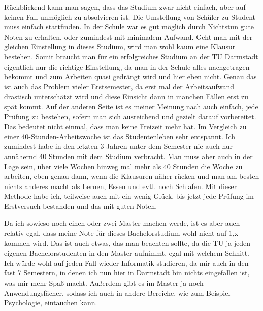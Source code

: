 {Rückblickend kann man sagen, dass das Studium zwar nicht einfach, aber auf keinen Fall unmöglich zu absolvieren ist. Die Umstellung von Schüler zu Student muss einfach stattfinden. In der Schule war es gut möglich durch Nichtstun gute Noten zu erhalten, oder zumindest mit minimalem Aufwand. Geht man mit der gleichen Einstellung in dieses Studium, wird man wohl kaum eine Klausur bestehen. Somit braucht man für ein erfolgreiches Studium an der TU Darmstadt eigentlich nur die richtige Einstellung, da man in der Schule alles nachgetragen bekommt und zum Arbeiten quasi gedrängt wird und hier eben nicht. Genau das ist auch das Problem vieler Erstsemester, da erst mal der Arbeitsaufwand drastisch unterschätzt wird und diese Einsicht dann in manchen Fällen erst zu spät kommt. Auf der anderen Seite ist es meiner Meinung nach auch einfach, jede Prüfung zu bestehen, sofern man sich ausreichend und gezielt darauf vorbereitet. Das bedeutet nicht einmal, dass man keine Freizeit mehr hat. Im Vergleich zu einer 40-Stunden-Arbeitswoche ist das Studentenleben sehr entspannt. Ich zumindest habe in den letzten 3 Jahren unter dem Semester nie auch nur annähernd 40 Stunden mit dem Studium verbracht. Man muss aber auch in der Lage sein, über viele Wochen hinweg mal mehr als 40 Stunden die Woche zu arbeiten, eben genau dann, wenn die Klausuren näher rücken und man am besten nichts anderes macht als Lernen, Essen und evtl. noch Schlafen. Mit dieser Methode habe ich, teilweise auch mit ein wenig Glück, bis jetzt jede Prüfung im Erstversuch bestanden und das mit guten Noten.

Da ich sowieso noch einen oder zwei Master machen werde, ist es aber auch relativ egal, dass meine Note für dieses Bachelorstudium wohl nicht auf 1,x kommen wird. Das ist auch etwas, das man beachten sollte, da die TU ja jeden eigenen Bachelorstudenten in den Master aufnimmt, egal mit welchem Schnitt. Ich würde wohl auf jeden Fall wieder Informatik studieren, da mir auch in den fast 7 Semestern, in denen ich nun hier in Darmstadt bin nichts eingefallen ist, was mir mehr Spaß macht. Außerdem gibt es im Master ja noch Anwendungsfächer, sodass ich auch in andere Bereiche, wie zum Beispiel Psychologie, eintauchen kann.

}
{}

\vfill
{}

\newpage